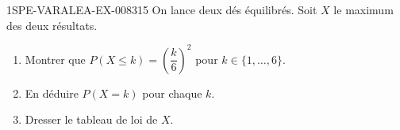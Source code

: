 \begin{exercice}{1SPE-VARALEA-EX-008}{3}{15}
On lance deux dés équilibrés. Soit $X$ le maximum des deux résultats.

\begin{enumerate}
  \item Montrer que $P(X \leq k) = \left(\dfrac{k}{6}\right)^2$ pour $k \in \{1,\ldots,6\}$.
  \item En déduire $P(X = k)$ pour chaque $k$.
  \item Dresser le tableau de loi de $X$.
\end{enumerate}
\end{exercice}
